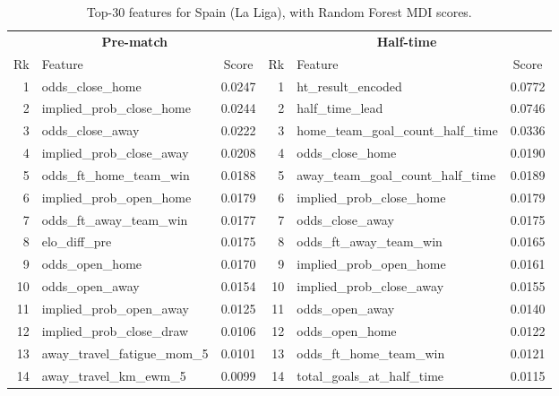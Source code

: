 \documentclass[pdflatex,sn-mathphys-num]{sn-jnl}
\theoremstyle{thmstyleone}
\theoremstyle{thmstyletwo}
\theoremstyle{thmstylethree}
\begin{document}
\begin{table}[h]
\caption{Top-30 features for Spain (La Liga), with Random Forest MDI scores.}\label{tab:fi-esp}
\footnotesize
\begin{tabular*}{\textwidth}{@{\extracolsep\fill}rlc|rlc@{}}
\toprule
\multicolumn{3}{c|}{\textbf{Pre-match}} & \multicolumn{3}{c}{\textbf{Half-time}} \\
Rk & Feature & Score & Rk & Feature & Score \\
\midrule
1  & odds\_close\_home                  & 0.0247 & 1  & ht\_result\_encoded                    & 0.0772 \\
2  & implied\_prob\_close\_home          & 0.0244 & 2  & half\_time\_lead                       & 0.0746 \\
3  & odds\_close\_away                  & 0.0222 & 3  & home\_team\_goal\_count\_half\_time     & 0.0336 \\
4  & implied\_prob\_close\_away          & 0.0208 & 4  & odds\_close\_home                       & 0.0190 \\
5  & odds\_ft\_home\_team\_win          & 0.0188 & 5  & away\_team\_goal\_count\_half\_time     & 0.0189 \\
6  & implied\_prob\_open\_home           & 0.0179 & 6  & implied\_prob\_close\_home              & 0.0179 \\
7  & odds\_ft\_away\_team\_win          & 0.0177 & 7  & odds\_close\_away                       & 0.0175 \\
8  & elo\_diff\_pre                     & 0.0175 & 8  & odds\_ft\_away\_team\_win               & 0.0165 \\
9  & odds\_open\_home                   & 0.0170 & 9  & implied\_prob\_open\_home               & 0.0161 \\
10 & odds\_open\_away                   & 0.0154 & 10 & implied\_prob\_close\_away              & 0.0155 \\
11 & implied\_prob\_open\_away           & 0.0125 & 11 & odds\_open\_away                        & 0.0140 \\
12 & implied\_prob\_close\_draw          & 0.0106 & 12 & odds\_open\_home                        & 0.0122 \\
13 & away\_travel\_fatigue\_mom\_5       & 0.0101 & 13 & odds\_ft\_home\_team\_win               & 0.0121 \\
14 & away\_travel\_km\_ewm\_5            & 0.0099 & 14 & total\_goals\_at\_half\_time            & 0.0115 \\

\end{tabular*}
\end{table}
\end{document}
